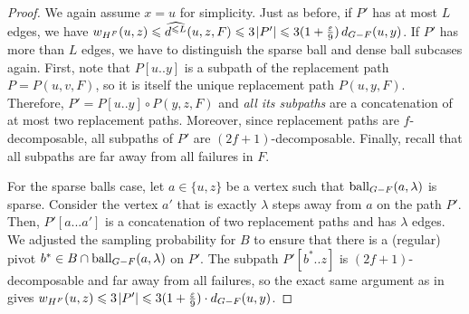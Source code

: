\documentclass{article}\usepackage[a4paper,margin=20mm]{geometry}
\newcommand*{\length}[1]{|#1|}
\newcommand*{\ball}{\mbox{\rm ball}}
\newcommand*{\nwspace}{\hspace*{.1em}}
\renewcommand{\le}{\leqslant}
\newcommand{\eps}{\varepsilon}
\begin{document}
\begin{proof}
	We again assume $x=u$ for simplicity.
	Just as before, if $P'$ has at most $L$ edges, we have
	$w_{H^F}(u,z) \le \widehat{d^{\le L}}(u,z,F) \le 3 \nwspace \length{P'}
      \le 3(1+\frac{\eps}{9}) \, d_{G-F}(u,y)$.
%  	
  	If $P'$ has more than $L$ edges, we have to distinguish 
  	the sparse ball and dense ball subcases again.
  	First, note that $P[u..y]$ is a subpath of the replacement path $P = P(u,v,F)$,
  	so it is itself the unique replacement path $P(u,y,F)$.
  	Therefore, $P' = P[u..y] \circ P(y,z,F)$ and \emph{all its subpaths} are a concatenation of at most two replacement paths.
  	Moreover, since replacement paths are $f$-decomposable,
  	all subpaths of $P'$ are $(2f{+}1)$-decomposable.
  	Finally, recall that all subpaths are far away from all failures in $F$.

  	For the sparse balls case, let $a \in \{u,z\}$ be a vertex such that $\ball_{G-F}(a,\lambda)$ is sparse.
  	Consider the vertex $a'$ that is exactly $\lambda$ steps away from $a$ on the path $P'$.
  	Then, $P'[a...a']$ is a concatenation of two replacement paths and has $\lambda$ edges.
  	We adjusted the sampling probability for $B$ to ensure that there is a (regular) pivot
  	$b^* \in B \cap \ball_{G-F}(a,\lambda)$ on $P'$.
  	The subpath $P'[b^*..z]$ is $(2f{+}1)$-decomposable and far away from all failures,
  	so the exact same argument as in 
  	gives $w_{H^F}(u,z) \le 3 \nwspace \length{P'} \le 3(1+ \tfrac{\eps}{9}) \cdot d_{G-F}(u,y)$.
  	

\end{proof}
\end{document}
